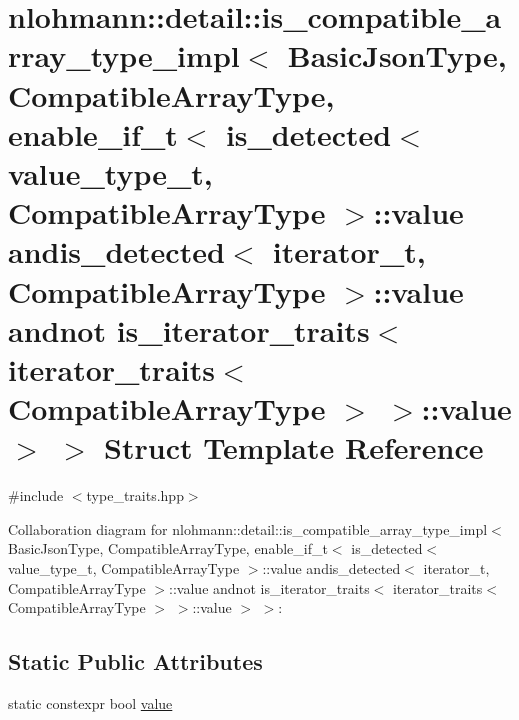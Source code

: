 \hypertarget{structnlohmann_1_1detail_1_1is__compatible__array__type__impl_3_01_basic_json_type_00_01_compatia6522f047ce0d0bd05b38ab6101e8786}{}\section{nlohmann\+:\+:detail\+:\+:is\+\_\+compatible\+\_\+array\+\_\+type\+\_\+impl$<$ Basic\+Json\+Type, Compatible\+Array\+Type, enable\+\_\+if\+\_\+t$<$ is\+\_\+detected$<$ value\+\_\+type\+\_\+t, Compatible\+Array\+Type $>$\+:\+:value andis\+\_\+detected$<$ iterator\+\_\+t, Compatible\+Array\+Type $>$\+:\+:value andnot is\+\_\+iterator\+\_\+traits$<$ iterator\+\_\+traits$<$ Compatible\+Array\+Type $>$ $>$\+:\+:value $>$ $>$ Struct Template Reference}
\label{structnlohmann_1_1detail_1_1is__compatible__array__type__impl_3_01_basic_json_type_00_01_compatia6522f047ce0d0bd05b38ab6101e8786}


{\ttfamily \#include $<$type\+\_\+traits.\+hpp$>$}



Collaboration diagram for nlohmann\+:\+:detail\+:\+:is\+\_\+compatible\+\_\+array\+\_\+type\+\_\+impl$<$ Basic\+Json\+Type, Compatible\+Array\+Type, enable\+\_\+if\+\_\+t$<$ is\+\_\+detected$<$ value\+\_\+type\+\_\+t, Compatible\+Array\+Type $>$\+:\+:value andis\+\_\+detected$<$ iterator\+\_\+t, Compatible\+Array\+Type $>$\+:\+:value andnot is\+\_\+iterator\+\_\+traits$<$ iterator\+\_\+traits$<$ Compatible\+Array\+Type $>$ $>$\+:\+:value $>$ $>$\+:
\subsection*{Static Public Attributes}
\begin{DoxyCompactItemize}
\item 
static constexpr bool \hyperlink{structnlohmann_1_1detail_1_1is__compatible__array__type__impl_3_01_basic_json_type_00_01_compatia6522f047ce0d0bd05b38ab6101e8786_aab057cae4562619c319310b5477425cb}{value}
\end{DoxyCompactItemize}


